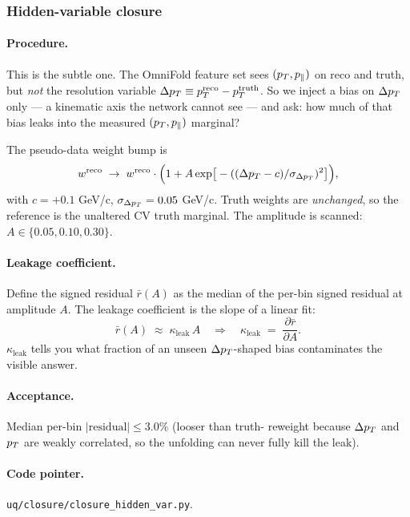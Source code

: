 \subsubsection{Hidden-variable closure}
\label{sec:closure-hv}

\paragraph{Procedure.}
This is the subtle one. The OmniFold feature set sees $(p_{T},p_{\parallel})$
on reco and truth, but \emph{not} the resolution variable
$\Delta p_{T} \equiv p_{T}^{\text{reco}}-p_{T}^{\text{truth}}$. So we inject a
bias on $\Delta p_{T}$ only --- a kinematic axis the network cannot see ---
and ask: how much of that bias leaks into the measured $(p_{T},p_{\parallel})$
marginal?

The pseudo-data weight bump is
\begin{equation}
w^{\text{reco}}
\;\to\;
w^{\text{reco}}\cdot
\Big(1 + A\exp\!\big[-((\Delta p_{T} - c)/\sigma_{\Delta p_{T}})^{2}\big]\Big),
\end{equation}
with $c=+0.1$ GeV/c, $\sigma_{\Delta p_{T}}=0.05$ GeV/c. Truth weights are
\emph{unchanged}, so the reference is the unaltered CV truth
marginal. The amplitude is scanned: $A\in\{0.05,0.10,0.30\}$.

\paragraph{Leakage coefficient.}
Define the signed residual $\bar r(A)$ as the median of the per-bin
signed residual at amplitude $A$. The leakage coefficient is the slope
of a linear fit:
\begin{equation}
\bar r(A) \;\approx\; \kappa_{\text{leak}} \, A
\quad\Rightarrow\quad
\kappa_{\text{leak}}
\;=\;
\frac{\partial \bar r}{\partial A}.
\end{equation}
$\kappa_{\text{leak}}$ tells you what fraction of an unseen
$\Delta p_{T}$-shaped bias contaminates the visible answer.

\paragraph{Acceptance.}
Median per-bin $|\text{residual}| \le 3.0\%$ (looser than truth-
reweight because $\Delta p_{T}$ and $p_{T}$ are weakly correlated, so the
unfolding can never fully kill the leak).

\paragraph{Code pointer.}
\texttt{uq/closure/closure\_hidden\_var.py}.

